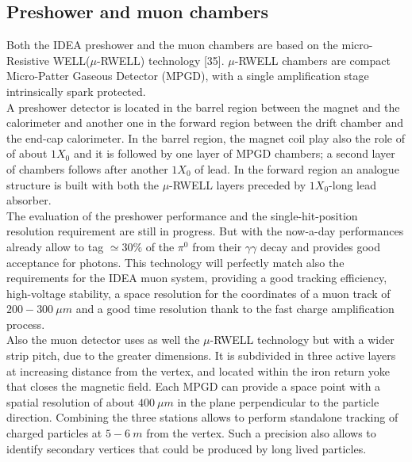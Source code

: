 \subsection{Preshower and muon chambers}
Both the IDEA preshower and the muon chambers are based on the micro-Resistive WELL($\mu$-RWELL) technology [35]. $\mu$-RWELL chambers are compact Micro-Patter Gaseous Detector (MPGD), with a single amplification stage intrinsically spark protected.\\

A preshower detector is located in the barrel region between the magnet and the calorimeter and another one in the forward region between the drift chamber and the end-cap calorimeter.
In the barrel region, the magnet coil play also the role of of about $1 X_0$ and it is followed by one layer of MPGD chambers; a second layer of chambers follows after another $1 X_0$ of lead. In the forward region an analogue structure is built with both the $\mu$-RWELL layers preceded by $1 X_0$-long lead absorber.\\
The evaluation of the preshower performance and the single-hit-position resolution requirement are still in progress.
But with the now-a-day performances already allow to tag $\simeq 30\%$ of the $\pi^0$ from their $\gamma\gamma$ decay and provides good acceptance for photons.
This technology will perfectly match also the requirements for the IDEA muon system, providing a good tracking efficiency, high-voltage stability, a space resolution for the coordinates of a muon track of $200-300\ \mu m$ and a good time resolution thank to the fast charge amplification process.\\

Also the muon detector uses as well the $\mu$-RWELL technology but with a wider strip pitch, due to the greater dimensions.  It is subdivided in three active layers at increasing distance from the vertex, and located within the iron return yoke that closes the magnetic field. Each MPGD can provide a space point with a spatial resolution of about $400\ \mu m$ in the plane perpendicular to the particle direction. Combining the three stations allows to perform standalone tracking of charged particles at $5-6\ m$ from the vertex. Such a precision also allows to identify secondary vertices that could be produced by long lived particles.
